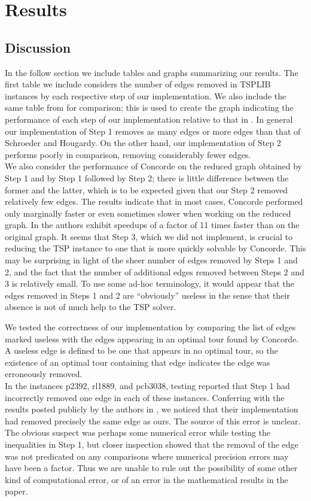 \documentclass{article} \usepackage[left=2cm,top=1.5cm,right=2cm,
\DeclareRobustCommand\{{\ifmmode\lbrace\else\textbraceleft\fi}
\DeclareRobustCommand\}{\ifmmode\rbrace\else\textbraceright\fi}
\begin{document}
\section{Results}

\subsection{Discussion}
In the follow section we include tables and graphs summarizing our
results. The first table we include considers the number of edges
removed in TSPLIB instances by each respective step of our
implementation. We also include the same table from \cite{paper} for
comparison; this is used to create the graph indicating the
performance of each step of our implementation relative to that in
\cite{paper}. In general our implementation of Step 1 removes as many
edges or more edges than that of Schroeder and Hougardy. On the other
hand, our implementation of Step 2 performs poorly in comparison,
removing considerably fewer edges.\\
We also consider the performance of Concorde on the reduced graph
obtained by Step 1 and by Step 1 followed by Step 2; there is little
difference between the former and the latter, which is to be expected
given that our Step 2 removed relatively few edges. The results
indicate that in most cases, Concorde performed only marginally faster
or even sometimes slower when working on the reduced graph. In
\cite{paper} the authors exhibit speedups of a factor of 11 times
faster than on the original graph. It seems that Step 3,
which we did not implement, is crucial to reducing the TSP instance to
one that is more quickly solvable by Concorde. This may be surprising
in light of the sheer number of edges removed by Steps 1 and 2, and
the fact that the number of additional edges removed between Steps 2
and 3 is relatively small. To use some ad-hoc terminology, it would
appear that the edges removed in Steps 1 and 2 are ``obviously''
useless in the sense that their absence is not of much help to the TSP
solver.

We tested the correctness of our implementation by comparing the list
of edges marked useless with the edges appearing in an optimal
tour found by Concorde. A useless edge is defined to be one that
appears in no optimal tour, so the existence of an optimal tour
containing that edge indicates the edge was erroneously removed. \\
In the instances p2392, rl1889, and pcb3038, testing reported that
Step 1 had incorrectly removed one edge in each of these
instances. Conferring with the results posted publicly by the authors
in \cite{results}, we noticed that their implementation had removed
precisely the same edge as ours. The source of this error is unclear. The
obvious suspect was perhaps some numerical error while testing the
inequalities in Step 1, but closer inspection showed that the removal
of the edge was not predicated on any comparisons where numerical
precision errors may have been a factor. Thus we are unable to rule
out the possibility of some other kind of computational error, or of
an error in the mathematical results in the paper. 
\end{document}

